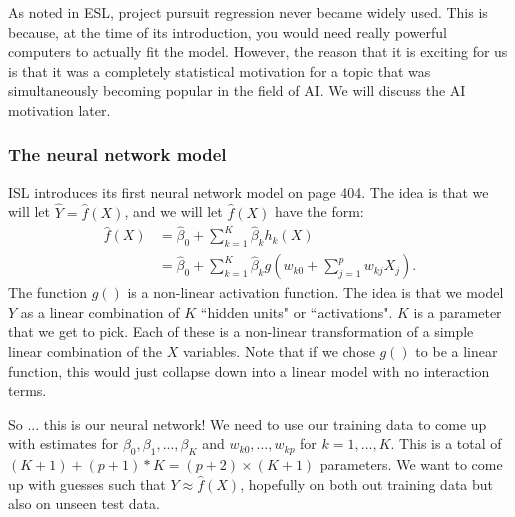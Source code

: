 As noted in ESL, project pursuit regression never became widely used. This is because, at the time of its introduction, you would need really powerful computers to actually fit the model. However, the reason that it is exciting for us is that it was a completely statistical motivation for a topic that was simultaneously becoming popular in the field of AI. We will discuss the AI motivation later. 



\subsubsection{The neural network model}

ISL introduces its first neural network model on page 404. The idea is that we will let $\hat{Y} = \hat{f}(X)$, and we will let $\hat{f}(X)$ have the form: 
\begin{align}
\nonumber
\hat{f}(X) &= \hat{\beta}_0 + \sum_{k=1}^K \hat{\beta}_k h_k(X)  \\
\label{eq_NN}
&=  \hat{\beta}_0 + \sum_{k=1}^K \hat{\beta}_k g\left(w_{k0} + \sum_{j=1}^p w_{kj} X_j \right). 
\end{align}
The function $g()$ is a non-linear activation function. The idea is that we model $Y$ as a linear combination of $K$ ``hidden units" or ``activations". $K$ is a parameter that we get to pick. Each of these is a non-linear transformation of a simple linear combination of the $X$ variables. Note that if we chose $g()$ to be a linear function, this would just collapse down into a linear model with no interaction terms. 

So ... this is our neural network! We need to use our training data to come up with estimates for $\beta_0, \beta_1, ..., \beta_K$ and $w_{k0}, \ldots, w_{kp}$ for $k=1,\ldots, K$. This is a total of $(K+1)+(p+1)*K = (p+2)\times (K+1)$ parameters. We want to come up with guesses such that $Y \approx \hat{f}(X)$, hopefully on both out training data but also on unseen test data. 

